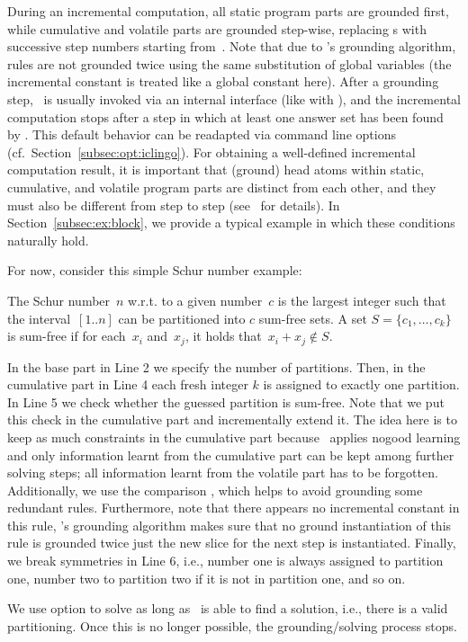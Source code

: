 During an incremental computation, all static program parts are grounded first,
while cumulative and volatile parts are grounded step-wise,
replacing s with successive step numbers starting from~.
Note that due to \gringo's grounding algorithm,
rules are not grounded twice using the same substitution of global variables
(the incremental constant is treated like a global constant here).
After a grounding step, \clasp\ is usually invoked via an internal interface
(like with \clingo), and the incremental computation stops after a step
in which at least one answer set has been found by \clasp.
This default behavior can be readapted via command line 
options (cf.\ Section~\ref{subsec:opt:iclingo}).
For obtaining a well-defined incremental computation result,
it is important that (ground) head atoms within static, cumulative, and volatile program parts
are distinct from each other, and they must also be different from step to step
(see~\cite{gekakaosscth08a} for details).
In Section~\ref{subsec:ex:block},
we provide a typical example in which these conditions naturally hold.

\begin{example}
For now, consider this simple Schur number example:

%
The Schur number~$n$ w.r.t. to a given number~$c$ is the largest integer 
such that the interval~$[1..n]$ can be partitioned into $c$ sum-free sets.
A set $S=\{c_1 ,\dots, c_k\}$ is sum-free if for each~$x_i$ and~$x_j$, 
it holds that~$x_i + x_j \not \in S$.

In the base part in Line 2 we specify the number of partitions.
Then, in the cumulative part in Line 4 each fresh integer $k$
is assigned to exactly one partition.
In Line 5 we check whether the guessed partition is sum-free.
Note that we put this check in the cumulative part and incrementally extend it.
The idea here is to keep as much constraints in the cumulative part
because \clasp\ applies nogood learning and only information learnt from 
the cumulative part can be kept among further solving steps;
all information learnt from the volatile part has to be forgotten.
Additionally, we use the comparison  , 
which helps to avoid grounding some redundant rules.
Furthermore, note that there appears no incremental constant in this rule,
\gringo's grounding algorithm makes sure that no ground instantiation of this rule 
is grounded twice just the new slice for the next step is instantiated.
Finally, we break symmetries in Line 6, i.e.,
number one is always assigned to partition one, number two to partition two 
if it is not in partition one, and so on. 

We use option  to solve as long as 
\iclingo\ is able to find a solution, i.e., there is a 
valid partitioning. Once this is no longer possible, the grounding/solving 
process stops.\eexample
\end{example}

